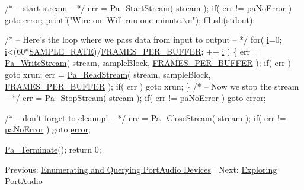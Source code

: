 \begin{DoxyCode}
\textcolor{comment}{/* -- start stream -- */}
err = \hyperlink{portaudio_8h_a7432aadd26c40452da12fa99fc1a047b}{Pa\_StartStream}( stream );
\textcolor{keywordflow}{if}( err != \hyperlink{portaudio_8h_a2e45bf8b5145f131a91c128af2bdaec7aeb09d15a48b6c1034728a9c518cfe4ba}{paNoError} ) \textcolor{keywordflow}{goto} \hyperlink{sndfile__load_8m_a3a81ee160b23b01b04b7c08b35123218}{error};
\hyperlink{octave__test_8m_ac6d0e62c65e5715b13a5fcb381118888}{printf}(\textcolor{stringliteral}{"Wire on. Will run one minute.\(\backslash\)n"}); \hyperlink{octave__test_8m_a0491ca59ff11d37e0e71589ce262a30c}{fflush}(\hyperlink{namespacewaflib_1_1ansiterm_acf95a6e21629de2ca2b5716f5089f3f0}{stdout});

\textcolor{comment}{/* -- Here's the loop where we pass data from input to output -- */}
\textcolor{keywordflow}{for}( \hyperlink{checksum_8c_ab80e330a3bc9e38c1297fe17381e92b4}{i}=0; \hyperlink{checksum_8c_ab80e330a3bc9e38c1297fe17381e92b4}{i}<(60*\hyperlink{sine_8cxx_a254783139625fe796c8924e0b04b1aee}{SAMPLE\_RATE})/\hyperlink{sine_8cxx_a0ba5ca6cf467f019cb933a2f8bbaeb58}{FRAMES\_PER\_BUFFER}; ++
      \hyperlink{checksum_8c_ab80e330a3bc9e38c1297fe17381e92b4}{i} )
\{
   err = \hyperlink{portaudio_8h_a075a6efb503a728213bdae24347ed27d}{Pa\_WriteStream}( stream, sampleBlock, \hyperlink{sine_8cxx_a0ba5ca6cf467f019cb933a2f8bbaeb58}{FRAMES\_PER\_BUFFER} );
   \textcolor{keywordflow}{if}( err ) \textcolor{keywordflow}{goto} xrun;
   err = \hyperlink{portaudio_8h_a0b62d4b74b5d3d88368e9e4c0b8b2dc7}{Pa\_ReadStream}( stream, sampleBlock, \hyperlink{sine_8cxx_a0ba5ca6cf467f019cb933a2f8bbaeb58}{FRAMES\_PER\_BUFFER} );
   \textcolor{keywordflow}{if}( err ) \textcolor{keywordflow}{goto} xrun;
\}
\textcolor{comment}{/* -- Now we stop the stream -- */}
err = \hyperlink{portaudio_8h_af18dd60220251286c337631a855e38a0}{Pa\_StopStream}( stream );
\textcolor{keywordflow}{if}( err != \hyperlink{portaudio_8h_a2e45bf8b5145f131a91c128af2bdaec7aeb09d15a48b6c1034728a9c518cfe4ba}{paNoError} ) \textcolor{keywordflow}{goto} \hyperlink{sndfile__load_8m_a3a81ee160b23b01b04b7c08b35123218}{error};

\textcolor{comment}{/* -- don't forget to cleanup! -- */}
err = \hyperlink{portaudio_8h_a92f56f88cbd14da0e8e03077e835d104}{Pa\_CloseStream}( stream );
\textcolor{keywordflow}{if}( err != \hyperlink{portaudio_8h_a2e45bf8b5145f131a91c128af2bdaec7aeb09d15a48b6c1034728a9c518cfe4ba}{paNoError} ) \textcolor{keywordflow}{goto} \hyperlink{sndfile__load_8m_a3a81ee160b23b01b04b7c08b35123218}{error};

\hyperlink{portaudio_8h_a0db317604e916e8bd6098e60e6237221}{Pa\_Terminate}();
\textcolor{keywordflow}{return} 0;
\end{DoxyCode}


Previous\+: \hyperlink{querying_devices}{Enumerating and Querying Port\+Audio Devices} $\vert$ Next\+: \hyperlink{exploring}{Exploring Port\+Audio} 